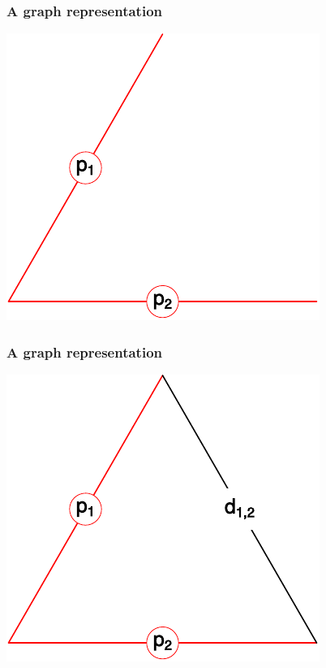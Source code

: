 \documentclass[20pt]{beamer}
\begin{document}
\begin{frame}
\frametitle{A graph representation}
\centering
\includegraphics[scale=1.5]{Figures/edgep2_1.pdf}\\
\end{frame}

\begin{frame}
\frametitle{A graph representation}
\centering
\includegraphics[scale=1.5]{Figures/edgep2_2.pdf}\\
\end{frame}
\end{document}
